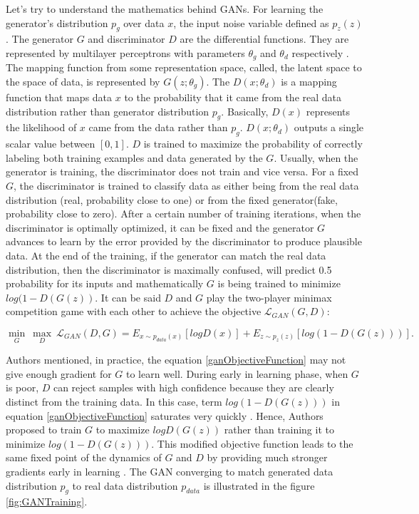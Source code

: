 Let's try to understand the mathematics behind \acp{GAN}. For learning the generator’s distribution $p_g$ over data $x$, the input noise variable defined as $p_z(z)$. The generator $G$ and discriminator $D$ are the differential functions. They are represented by multilayer perceptrons with parameters $\theta_g$ and $\theta_d$ respectively \cite{goodfellow2014generative}. The mapping function from some representation space, called, the latent space to the space of data, is represented by $G(z; \theta_g)$. The $D(x; \theta_d)$ is a mapping function that maps data $x$ to the probability that it came from the real data distribution rather than generator distribution $p_g$. Basically, $D(x)$ represents the likelihood of $x$ came from the data rather than $p_g$. $D(x; \theta_d)$ outputs a single scalar value between $[0,1]$. $D$ is trained to maximize the probability of correctly labeling both training examples and data generated by the $G$. Usually, when the generator is training, the discriminator does not train and vice versa. For a fixed $G$, the discriminator is trained to classify data as either being from the real data distribution (real, probability close to one) or from the fixed generator(fake, probability close to zero). After a certain number of training iterations, when the discriminator is optimally optimized, it can be fixed and the generator $G$ advances to learn by the error provided by the discriminator to produce plausible data. At the end of the training, if the generator can match the real data distribution, then the discriminator is maximally confused, will predict 0.5 probability for its inputs and mathematically $G$ is being trained to minimize $log(1 - D(G(z))$. It can be said $D$ and $G$ play the two-player minimax competition game with each other  to achieve the objective $\mathcal{L}_{GAN}(G, D)$:


\begin{equation}\label{ganObjectiveFunction}
\underset{G}{\min}\ \underset{D}{\max}\ \mathcal{L}_{GAN}(D, G) = E_{x\sim p_{data}(x)}[log D(x)] + E_{z\sim p_z(z)}[log(1 - D(G(z)))].
\end{equation}


Authors mentioned, in practice, the equation \ref{ganObjectiveFunction} may not give enough gradient for $G$ to learn well. During early in learning phase, when $G$ is poor, $D$ can reject samples with high confidence because they are clearly distinct from the training data. In this case, term $log(1 - D(G(z)))$ in equation \ref{ganObjectiveFunction} saturates very quickly \cite{goodfellow2014generative}. Hence, Authors proposed to train $G$ to maximize $log D(G(z))$ rather than training it to minimize $log(1 - D(G(z)))$. This modified objective function leads to the same fixed point of the dynamics of $G$ and $D$ by providing much stronger gradients early in learning \cite{goodfellow2014generative}. The \ac{GAN} converging to match generated data distribution $p_g$ to real data distribution $p_{data}$ is illustrated in the figure \ref{fig:GANTraining}.

